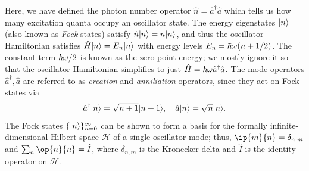 Here, we have defined the photon number operator $\hat{n} = \hat{a}^\dagger\hat{a}$ which tells us how many excitation quanta occupy an oscillator state. The energy eigenstates $\lvert n\rangle$ (also known as \textit{Fock} states) satisfy $\hat{n}\lvert n\rangle = n\lvert n\rangle$, and thus the oscillator Hamiltonian satisfies $\hat{H}\lvert n\rangle = E_n\lvert n\rangle$ with energy levels $E_n = \hbar\omega(n + 1/2)$. The constant term $\hbar\omega/2$ is known as the zero-point energy; we mostly ignore it so that the oscillator Hamiltonian simplifies to just $\hat{H} = \hbar\omega \hat{a}^\dagger\hat{a}$. The mode operators $\hat{a}^\dagger, \hat{a}$ are referred to as \textit{creation} and \textit{anniliation} operators, since they act on Fock states via
\begin{equation}
    \hat{a}^\dagger\lvert n\rangle = \sqrt{n+1}\lvert n+1\rangle, \quad \hat{a}\lvert n\rangle = \sqrt{n}\lvert n\rangle.
\end{equation}
The Fock states $\{\lvert n\rangle\}_{n=0}^\infty$ can be shown to form a basis for the formally infinite-dimensional Hilbert space $\mathcal{H}$ of a single oscillator mode; thus, $\ip{m}{n} = \delta_{n, m}$ and $\sum_n \op{n}{n} = \hat{I}$, where $\delta_{n, m}$ is the Kronecker delta and $\hat{I}$ is the identity operator on $\mathcal{H}$. 

